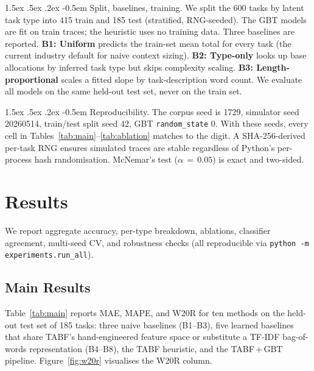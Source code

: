 \documentclass{article}
\makeatletter
\newcommand{\code}[1]{\texttt{\small #1}}
\renewcommand\paragraph{%
  \@startsection{paragraph}{4}{\z@}%
    {1.5ex \@plus.5ex \@minus.2ex}%
    {-0.5em}%
    {\normalfont\normalsize\bfseries}%
}
\makeatother
\begin{document}
\paragraph{Split, baselines, training.}
We split the 600 tasks by latent task type into 415 train and 185 test
(stratified, RNG-seeded). The GBT models are fit on train traces; the
heuristic uses no training data. Three baselines are reported.
\textbf{B1: Uniform} predicts the train-set mean total for every task
(the current industry default for naive context sizing). \textbf{B2:
Type-only} looks up base allocations by inferred task type but skips
complexity scaling. \textbf{B3: Length-proportional} scales a fitted
slope by task-description word count. We evaluate all models on the
same held-out test set, never on the train set.

\paragraph{Reproducibility.}
The corpus seed is 1729, simulator seed 20260514, train/test split seed
42, GBT \code{random\_state} 0. With these seeds, every cell in
Tables~\ref{tab:main}--\ref{tab:ablation} matches to the digit. A
SHA-256-derived per-task RNG ensures simulated traces are stable
regardless of Python's per-process hash randomisation. McNemar's test
($\alpha\,{=}\,0.05$) is exact and two-sided.

\section{Results}
\label{sec:results}

We report aggregate accuracy, per-type breakdown, ablations, classifier
agreement, multi-seed CV, and robustness checks (all reproducible via
\code{python -m experiments.run\_all}).

\subsection{Main Results}

Table~\ref{tab:main} reports MAE, MAPE, and W20R for ten methods on the
held-out test set of 185 tasks: three naive baselines (B1--B3), five
learned baselines that share TABF's hand-engineered feature space or
substitute a TF-IDF bag-of-words representation (B4--B8), the TABF
heuristic, and the TABF\,+\,GBT pipeline. Figure~\ref{fig:w20r}
visualises the W20R column.
\end{document}
